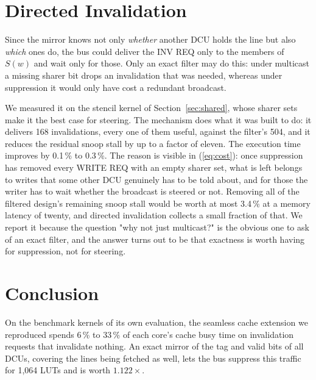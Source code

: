\documentclass[conference]{IEEEtran}
\begin{document}
\section{Directed Invalidation}
\label{sec:rejected}

Since the mirror knows not only \emph{whether} another DCU holds the line but
also \emph{which} ones do, the bus could deliver the INV REQ only to the
members of $S(w)$ and wait only for those. Only an exact filter may do this:
under multicast a missing sharer bit drops an invalidation that was needed,
whereas under suppression it would only have cost a redundant broadcast.

We measured it on the stencil kernel of Section~\ref{sec:shared}, whose
sharer sets make it the best case for steering. The mechanism does what it
was built to do: it delivers 168 invalidations, every one of them useful,
against the filter's 504, and it reduces the residual snoop stall by up to a
factor of eleven. The execution time improves by 0.1\,\% to 0.3\,\%. The
reason is visible in (\ref{eq:cost}): once suppression has removed every
WRITE REQ with an empty sharer set, what is left belongs to writes that some
other DCU genuinely has to be told about, and for those the writer has to
wait whether the broadcast is steered or not. Removing all of the filtered
design's remaining snoop stall would be worth at most 3.4\,\% at a memory
latency of twenty, and directed invalidation collects a small fraction of
that. We report it because the question "why not just multicast?" is the
obvious one to ask of an exact filter, and the answer turns out to be that
exactness is worth having for suppression, not for steering.

\section{Conclusion}
\label{sec:concl}

On the benchmark kernels of its own evaluation, the seamless cache extension
we reproduced spends 6\,\% to 33\,\% of each core's cache busy time on
invalidation requests that invalidate nothing. An exact mirror of the tag and
valid bits of all DCUs, covering the lines being fetched as well, lets the bus
suppress this traffic for 1{,}064 LUTs and is worth $1.122\times$.
\end{document}
